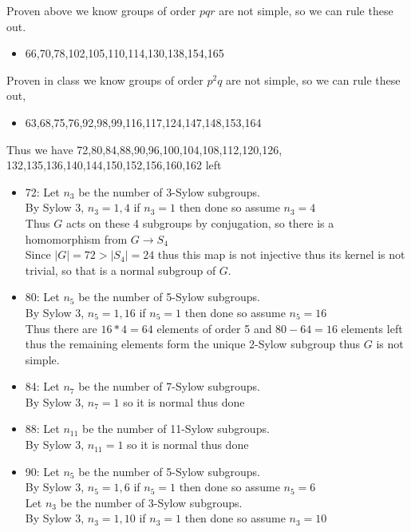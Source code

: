 \documentclass[12pt,letterpaper]{article}
\theoremstyle{definition}
\begin{document}
Proven above we know groups of order $pqr$ are not simple, so we can rule these out.
\begin{itemize}
    \item 66,70,78,102,105,110,114,130,138,154,165
\end{itemize}
Proven in class we know groups of order $p^2q$ are not simple, so we can rule these out,
\begin{itemize}
    \item 63,68,75,76,92,98,99,116,117,124,147,148,153,164
\end{itemize}
Thus we have 72,80,84,88,90,96,100,104,108,112,120,126,\\
132,135,136,140,144,150,152,156,160,162 left

\begin{itemize}
    \item 72:
    Let $n_3$ be the number of 3-Sylow subgroups.\\
    By Sylow 3, $n_3=1,4$ if $n_3=1$ then done so assume $n_3=4$\\
    Thus $G$ acts on these 4 subgroups by conjugation, so there is a homomorphism from $G \rightarrow S_4$\\
    Since $|G|=72 > |S_4|=24$ thus this map is not injective thus its kernel is not trivial, so that is a normal subgroup of $G$.
    \item 80:
    Let $n_5$ be the number of 5-Sylow subgroups.\\
    By Sylow 3, $n_5=1,16$ if $n_5=1$ then done so assume $n_5=16$\\
    Thus there are $16*4=64$ elements of order 5 and $80-64=16$ elements left thus the remaining elements form the unique 2-Sylow subgroup thus $G$ is not simple.
    \item 84:
    Let $n_7$ be the number of 7-Sylow subgroups.\\
    By Sylow 3, $n_7=1$ so it is normal thus done
    \item 88:
    Let $n_{11}$ be the number of 11-Sylow subgroups.\\
    By Sylow 3, $n_{11}=1$ so it is normal thus done
    \item 90:
    Let $n_5$ be the number of 5-Sylow subgroups.\\
    By Sylow 3, $n_5=1,6$ if $n_5=1$ then done so assume $n_5=6$\\
    Let $n_3$ be the number of 3-Sylow subgroups.\\
    By Sylow 3, $n_3=1,10$ if $n_3=1$ then done so assume $n_3=10$\\

\end{itemize}
\end{document}
